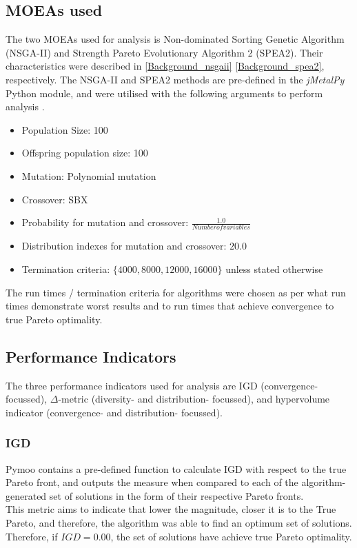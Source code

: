 \documentclass[sigconf, nonacm, preprint]{acmart}
\begin{document}
\subsection{MOEAs used}
The two MOEAs used for analysis is Non-dominated Sorting Genetic Algorithm (NSGA-II) and Strength Pareto Evolutionary Algorithm 2 (SPEA2). Their characteristics were described in \autoref{Background_nsgaii} \autoref{Background_spea2}, respectively. The NSGA-II and SPEA2 methods are pre-defined in the \textit{jMetalPy} Python module, and were utilised with the following arguments to perform analysis \cite{jmetalpy2019}.
\begin{itemize}
    \item Population Size: 100
    \item Offspring population size: 100
    \item Mutation: Polynomial mutation
    \item Crossover: SBX
    \item Probability for mutation and crossover: $\frac{1.0}{Number of variables}$
    \item Distribution indexes for mutation and crossover: $20.0$
    \item Termination criteria: $\{4000, 8000, 12000, 16000\}$ unless stated otherwise
\end{itemize}
The run times / termination criteria for algorithms were chosen as per what run times demonstrate worst results and to run times that achieve convergence to true Pareto optimality.
\subsection{Performance Indicators}
The three performance indicators used for analysis are IGD (convergence- focussed), $\Delta$-metric (diversity- and distribution- focussed), and hypervolume indicator (convergence- and distribution- focussed).
\subsubsection{IGD}
Pymoo \cite{pymoo2022} contains a pre-defined function to calculate IGD with respect to the true Pareto front, and outputs the measure when compared to each of the algorithm-generated set of solutions in the form of their respective Pareto fronts.\\
This metric aims to indicate that lower the magnitude, closer it is to the True Pareto, and therefore, the algorithm was able to find an optimum set of solutions. Therefore, if $IGD = 0.00$, the set of solutions have achieve true Pareto optimality.
\end{document}
